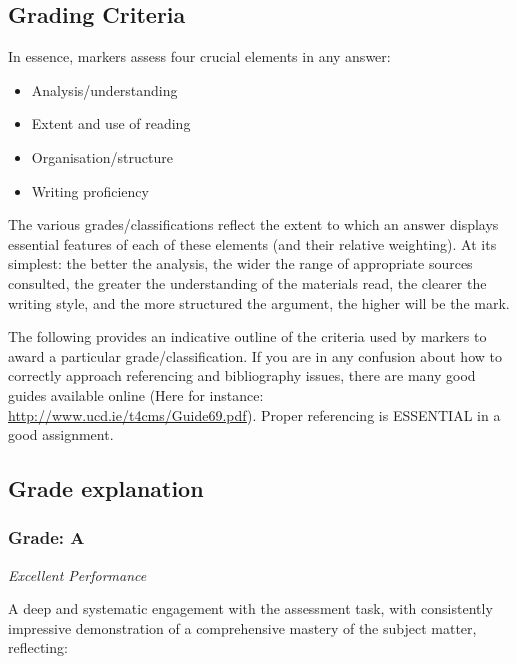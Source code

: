 \documentclass[12pt,a4paper]{article}
\begin{document}
\subsection*{Grading Criteria}

In essence, markers assess four crucial elements in any answer:

\begin{itemize}
  \item Analysis/understanding
  \item Extent and use of reading
  \item Organisation/structure
  \item Writing proficiency
\end{itemize}

The various grades/classifications reflect the extent to which an answer displays essential features of each of these elements (and their relative weighting). At its simplest: the better the analysis, the wider the range of appropriate sources consulted, the greater the understanding of the materials read, the clearer the writing style, and the more structured the argument, the higher will be the mark. 

The following provides an indicative outline of the criteria used by markers to award a particular grade/classification. If you are in any confusion about how to correctly approach referencing and bibliography issues, there are many good guides available online (Here for instance: \url{http://www.ucd.ie/t4cms/Guide69.pdf}). Proper referencing is ESSENTIAL in a good assignment.

\subsection*{Grade explanation}

\subsubsection*{Grade: A}

\textit{Excellent Performance}

A deep and systematic engagement with the assessment task, with consistently impressive demonstration of a comprehensive mastery of the subject matter, reflecting:
\end{document}
